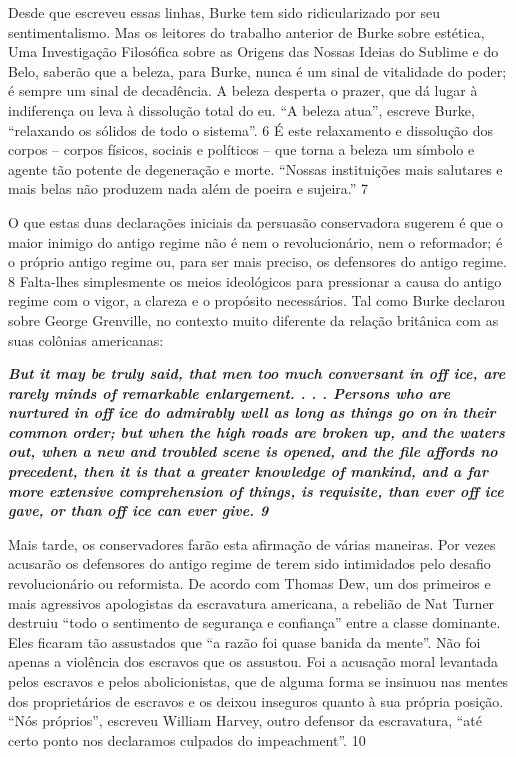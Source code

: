  
\par
 
Desde que escreveu essas linhas, Burke tem sido ridicularizado por seu sentimentalismo. Mas os leitores do trabalho anterior de Burke sobre estética, Uma Investigação Filosófica sobre as Origens das Nossas Ideias do Sublime e do Belo, saberão que a beleza, para Burke, nunca é um sinal de vitalidade do poder; é sempre um sinal de decadência. A beleza desperta o prazer, que dá lugar à indiferença ou leva à dissolução total do eu. “A beleza atua”, escreve Burke, “relaxando os sólidos de todo o sistema”.
 {\color{blue} 6}  
É este relaxamento e dissolução dos corpos – corpos físicos, sociais e políticos – que torna a beleza um símbolo e agente tão potente de degeneração e morte. “Nossas instituições mais salutares e mais belas não produzem nada além de poeira e sujeira.”
 {\color{blue} 7}  

 
\par
 
O que estas duas declarações iniciais da persuasão conservadora sugerem é que o maior inimigo do antigo regime não é nem o revolucionário, nem o reformador; é o próprio antigo regime ou, para ser mais preciso, os defensores do antigo regime.
 {\color{blue} 8}  
Falta-lhes simplesmente os meios ideológicos para pressionar a causa do antigo regime com o vigor, a clareza e o propósito necessários. Tal como Burke declarou sobre George Grenville, no contexto muito diferente da relação britânica com as suas colônias americanas:
 
\par
 

 \textbf{\textit{But it may be truly said, that men too much conversant in off ice, are rarely minds of remarkable enlargement. . . . Persons who are nurtured in off ice do admirably well as long as things go on in their common order; but when the high roads are broken up, and the waters out, when a new and troubled scene is opened, and the file affords no precedent, then it is that a greater knowledge of mankind, and a far more extensive comprehension of things, is requisite, than ever off ice gave, or than off ice can ever give. {{\color{blue} 9} } } }  
 
 
\par
 
Mais tarde, os conservadores farão esta afirmação de várias maneiras. Por vezes acusarão os defensores do antigo regime de terem sido intimidados pelo desafio revolucionário ou reformista. De acordo com Thomas Dew, um dos primeiros e mais agressivos apologistas da escravatura americana, a rebelião de Nat Turner destruiu “todo o sentimento de segurança e confiança” entre a classe dominante. Eles ficaram tão assustados que “a razão foi quase banida da mente”. Não foi apenas a violência dos escravos que os assustou. Foi a acusação moral levantada pelos escravos e pelos abolicionistas, que de alguma forma se insinuou nas mentes dos proprietários de escravos e os deixou inseguros quanto à sua própria posição. “Nós próprios”, escreveu William Harvey, outro defensor da escravatura, “até certo ponto nos declaramos culpados do impeachment”.
 {\color{blue} 10}  

